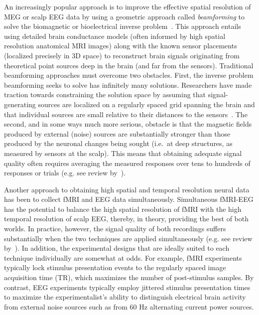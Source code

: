 \documentclass[11pt]{article}
\begin{document}
An increasingly popular approach is to improve the effective spatial
resolution of MEG or scalp EEG data by using a geometric approach
called \textit{beamforming} to solve the biomagnetic or bioelectrical
inverse problem~\cite{Sarv87}.  This approach entails using detailed
brain conductance models (often informed by high spatial resolution
anatomical MRI images) along with the known sensor placements
(localized precisely in 3D space) to reconstruct brain signals
originating from theoretical point sources deep in the brain (and far
from the sensors).  Traditional beamforming approaches must overcome
two obstacles.  First, the inverse problem beamforming seeks to solve
has infinitely many solutions.  Researchers have made traction towards
constraining the solution space by assuming that signal-generating
sources are localized on a regularly spaced grid spanning the brain
and that individual sources are small relative to their distances to
the sensors~\cite{Snyd91, BailEtal01, HillEtal05}.  The second, and in
some ways much more serious, obstacle is that the magnetic fields
produced by external (noise) sources are substantially stronger than
those produced by the neuronal changes being sought (i.e.\ at deep
structures, as measured by sensors at the scalp).  This means that
obtaining adequate signal quality often requires averaging the
measured responses over tens to hundreds of responses or trials
(e.g. see review by~\cite{HillEtal05}).

Another approach to obtaining high spatial and temporal resolution
neural data has been to collect fMRI and EEG data simultaneously.
Simultaneous fMRI-EEG has the potential to balance the high spatial
resolution of fMRI with the high temporal resolution of scalp EEG,
thereby, in theory, providing the best of both worlds.  In practice,
however, the signal quality of both recordings suffers substantially
when the two techniques are applied simultaneously (e.g. see review
by~\cite{HustEtal12}).  In addition, the experimental designs that are
ideally suited to each technique individually are somewhat at odds.
For example, fMRI experiments typically lock stimulus presentation
events to the regularly spaced image acquisition time (TR), which
maximizes the number of post-stimulus samples.  By contrast, EEG
experiments typically employ jittered stimulus presentation times to
maximize the experimentalist's ability to distinguish electrical brain
activity from external noise sources such as from 60 Hz alternating
current power sources.
\end{document}
